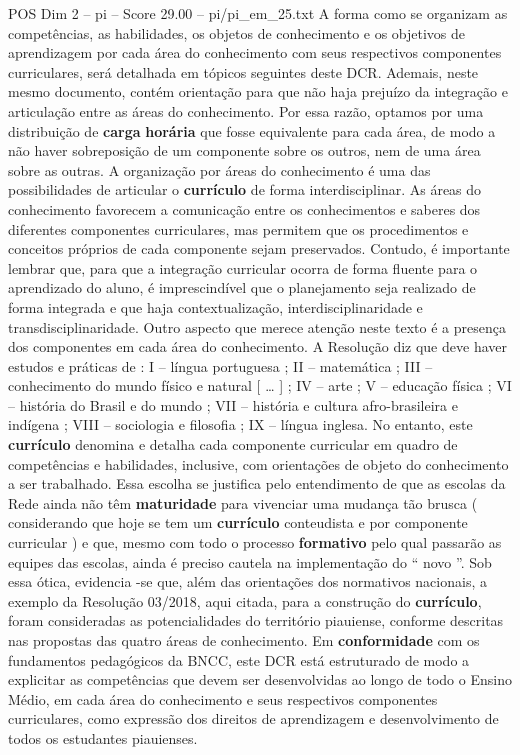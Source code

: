\begin{textsample}{POS Dim 2 – pi – Score 29.00 – pi/pi\_em\_25.txt}
A forma como se organizam as competências, as habilidades, os objetos de conhecimento e os objetivos de aprendizagem por cada área do conhecimento com seus respectivos componentes curriculares, será detalhada em tópicos seguintes deste DCR.
Ademais, neste mesmo documento, contém orientação para que não haja prejuízo da integração e articulação entre as áreas do conhecimento.
Por essa razão, optamos por uma distribuição de \textbf{carga} \textbf{horária} que fosse equivalente para cada área, de modo a não haver sobreposição de um componente sobre os outros, nem de uma área sobre as outras.
A organização por áreas do conhecimento é uma das possibilidades de articular o \textbf{currículo} de forma interdisciplinar.
As áreas do conhecimento favorecem a comunicação entre os conhecimentos e saberes dos diferentes componentes curriculares, mas permitem que os procedimentos e conceitos próprios de cada componente sejam preservados.
Contudo, é importante lembrar que, para que a integração curricular ocorra de forma fluente para o aprendizado do aluno, é imprescindível que o planejamento seja realizado de forma integrada e que haja contextualização, interdisciplinaridade e transdisciplinaridade.
Outro aspecto que merece atenção neste texto é a presença dos componentes em cada área do conhecimento.
A Resolução diz que deve haver estudos e práticas de : I – língua portuguesa ; II – matemática ; III – conhecimento do mundo físico e natural [ … ] ; IV – arte ; V – educação física ; VI – história do Brasil e do mundo ; VII – história e cultura afro-brasileira e indígena ; VIII – sociologia e filosofia ; IX – língua inglesa.
No entanto, este \textbf{currículo} denomina e detalha cada componente curricular em quadro de competências e habilidades, inclusive, com orientações de objeto do conhecimento a ser trabalhado.
Essa escolha se justifica pelo entendimento de que as escolas da Rede ainda não têm \textbf{maturidade} para vivenciar uma mudança tão brusca ( considerando que hoje se tem um \textbf{currículo} conteudista e por componente curricular ) e que, mesmo com todo o processo \textbf{formativo} pelo qual passarão as equipes das escolas, ainda é preciso cautela na implementação do “ novo ”.
Sob essa ótica, evidencia -se que, além das orientações dos normativos nacionais, a exemplo da Resolução 03/2018, aqui citada, para a construção do \textbf{currículo}, foram consideradas as potencialidades do território piauiense, conforme descritas nas propostas das quatro áreas de conhecimento.
Em \textbf{conformidade} com os fundamentos pedagógicos da BNCC, este DCR está estruturado de modo a explicitar as competências que devem ser desenvolvidas ao longo de todo o Ensino Médio, em cada área do conhecimento e seus respectivos componentes curriculares, como expressão dos direitos de aprendizagem e desenvolvimento de todos os estudantes piauienses.

\end{textsample}
